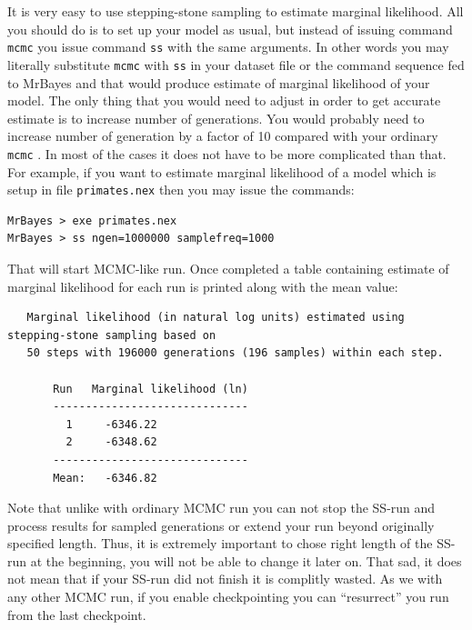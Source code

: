 \documentclass[12pt]{book}
\newcommand{\ttt}[1]{\texttt{#1} }
\begin{document}
It is very easy to use stepping-stone sampling to estimate marginal likelihood. All you should do
is to set up your model as usual, but instead of issuing command \ttt{mcmc} you issue command
\ttt{ss} with the same arguments. In other words you may literally substitute \ttt{mcmc} with
\ttt{ss} in your dataset file or the command sequence fed to MrBayes and that would produce
estimate of marginal likelihood of your model. The only thing that you would need to adjust in
order to get accurate estimate is to increase number of generations. You would probably need to
increase number of generation by a factor of 10 compared with your ordinary \ttt{mcmc}.  In most of
the cases it does not have to be more complicated than that. For example, if you want to estimate
marginal likelihood of a model which is setup in file \ttt{primates.nex} then you may issue the
commands:

\begin{singlespacing}
\begin{verbatim}
MrBayes > exe primates.nex
MrBayes > ss ngen=1000000 samplefreq=1000
\end{verbatim}
\end{singlespacing}

That will start MCMC-like run. Once completed a table containing estimate of marginal likelihood
for each run is printed along with the mean value: 

\begin{singlespacing}
\scriptsize
\begin{verbatim}
   Marginal likelihood (in natural log units) estimated using stepping-stone sampling based on
   50 steps with 196000 generations (196 samples) within each step.

       Run   Marginal likelihood (ln)
       ------------------------------
         1     -6346.22
         2     -6348.62
       ------------------------------
       Mean:   -6346.82
\end{verbatim}
\normalsize
\end{singlespacing}

Note that unlike with ordinary MCMC run you can not stop the SS-run and process results for sampled
generations or extend your run beyond originally specified length. Thus, it is extremely important
to chose right length of the SS-run at the beginning, you will not be able to change it later on.
That sad, it does not mean that if your SS-run did not finish it is complitly wasted.  As we with
any other MCMC run, if you enable checkpointing you can “resurrect” you run from the last
checkpoint. 
\end{document}

